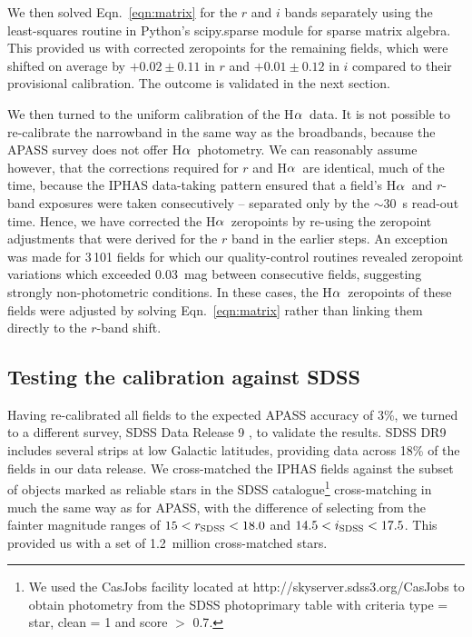 \documentclass[useAMS,usenatbib]{mn2e}
\def\ha{\mbox{H$\rm \alpha$}}
\begin{document}
We then solved Eqn.~\ref{eqn:matrix} for the $r$ and $i$ bands
separately using the least-squares routine 
in Python's {\sc scipy.sparse} module for sparse matrix algebra.
This provided us with corrected zeropoints for the remaining fields,
which were shifted on average by $+0.02\pm0.11$ in $r$ 
and $+0.01\pm0.12$ in $i$ compared to their provisional calibration.
The outcome is validated in the next section.

We then turned to the uniform calibration of the \ha\ data.
It is not possible to re-calibrate the narrowband 
in the same way as the broadbands,
because the APASS survey does not offer \ha\ photometry.
We can reasonably assume however,
that the corrections required for $r$ and \ha\ are identical,
much of the time, because the IPHAS data-taking pattern ensured 
that a field's \ha\ and $r$-band exposures
were taken consecutively -- 
separated only by the $\sim$30~s read-out time.
Hence, we have corrected the \ha\ zeropoints 
by re-using the zeropoint adjustments that were derived for the $r$ band
in the earlier steps.
An exception was made for 3\,101 fields
for which our quality-control routines revealed
zeropoint variations which exceeded 0.03~mag 
between consecutive fields,
suggesting strongly non-photometric conditions.
In these cases, the \ha\ zeropoints of these fields
were adjusted by solving Eqn.~\ref{eqn:matrix}
rather than linking them directly to the $r$-band shift.

\subsection{Testing the calibration against SDSS}

Having re-calibrated all fields to the expected APASS accuracy of 3\%,
we turned to a different survey, SDSS Data Release 9 \citep{Ahn2012},
to validate the results.
SDSS DR9 includes several strips at low
Galactic latitudes,
providing data across 18\% of the fields in our data release.
We cross-matched the IPHAS fields against the subset of
objects marked as reliable stars in the SDSS catalogue\footnote{
We used the CasJobs facility located at http://skyserver.sdss3.org/CasJobs
to obtain photometry from the SDSS {\sc photoprimary} table 
with criteria {\sc type = star}, {\sc clean = 1} and {\sc score $>$ 0.7}.}
cross-matching in much the same way as for APASS,
with the difference of selecting from the  fainter magnitude ranges of 
$15<r_{\rm SDSS}<18.0$ and $14.5<i_{\rm SDSS}<17.5$.
This provided us with a set of 1.2~million cross-matched stars.
\end{document}
